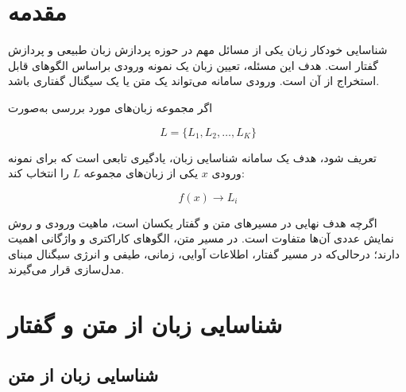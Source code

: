 


\section{مقدمه}

شناسایی خودکار زبان یکی از مسائل مهم در حوزه پردازش زبان طبیعی و پردازش گفتار است. هدف این مسئله، تعیین زبان یک نمونه ورودی براساس الگوهای قابل استخراج از آن است. ورودی سامانه می‌تواند یک متن یا یک سیگنال گفتاری باشد.

اگر مجموعه زبان‌های مورد بررسی به‌صورت

\begin{equation}
L=\{L_1,L_2,\ldots,L_K\}
\end{equation}

تعریف شود، هدف یک سامانه شناسایی زبان، یادگیری تابعی است که برای نمونه ورودی $x$ یکی از زبان‌های مجموعه $L$ را انتخاب کند:

\begin{equation}
f(x)\longrightarrow L_i
\end{equation}

اگرچه هدف نهایی در مسیرهای متن و گفتار یکسان است، ماهیت ورودی و روش نمایش عددی آن‌ها متفاوت است. در مسیر متن، الگوهای کاراکتری و واژگانی اهمیت دارند؛ درحالی‌که در مسیر گفتار، اطلاعات آوایی، زمانی، طیفی و انرژی سیگنال مبنای مدل‌سازی قرار می‌گیرند.


\section{شناسایی زبان از متن و گفتار}

\subsection{شناسایی زبان از متن}

